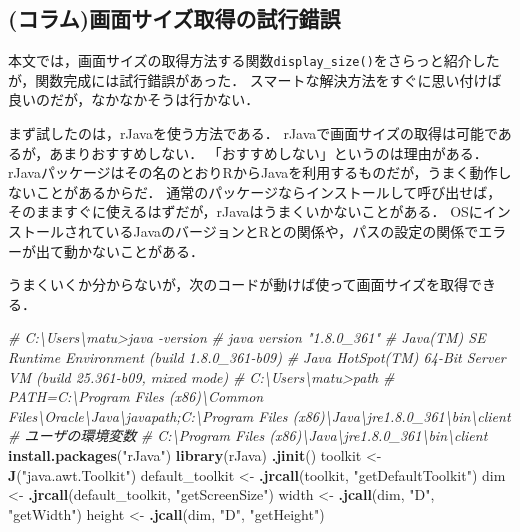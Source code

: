 \documentclass[
]{article}
\newenvironment{Shaded}{\begin{snugshade}}{\end{snugshade}}
\newcommand{\CommentTok}[1]{\textcolor[rgb]{0.56,0.35,0.01}{\textit{#1}}}
\newcommand{\FunctionTok}[1]{\textcolor[rgb]{0.13,0.29,0.53}{\textbf{#1}}}
\newcommand{\NormalTok}[1]{#1}
\newcommand{\OtherTok}[1]{\textcolor[rgb]{0.56,0.35,0.01}{#1}}
\newcommand{\StringTok}[1]{\textcolor[rgb]{0.31,0.60,0.02}{#1}}
\begin{document}
\hypertarget{ux30b3ux30e9ux30e0ux753bux9762ux30b5ux30a4ux30baux53d6ux5f97ux306eux8a66ux884cux932fux8aa4}{%
\subsection{(コラム)画面サイズ取得の試行錯誤}\label{ux30b3ux30e9ux30e0ux753bux9762ux30b5ux30a4ux30baux53d6ux5f97ux306eux8a66ux884cux932fux8aa4}}

本文では，画面サイズの取得方法する関数\texttt{display\_size()}をさらっと紹介したが，関数完成には試行錯誤があった．
スマートな解決方法をすぐに思い付けば良いのだが，なかなかそうは行かない．

まず試したのは，rJavaを使う方法である．
rJavaで画面サイズの取得は可能であるが，あまりおすすめしない．
「おすすめしない」というのは理由がある．
rJavaパッケージはその名のとおりRからJavaを利用するものだが，うまく動作しないことがあるからだ．
通常のパッケージならインストールして呼び出せば，そのまますぐに使えるはずだが，rJavaはうまくいかないことがある．
OSにインストールされているJavaのバージョンとRとの関係や，パスの設定の関係でエラーが出て動かないことがある．

うまくいくか分からないが，次のコードが動けば使って画面サイズを取得できる．

\begin{Shaded}
\begin{Highlighting}[]
  \CommentTok{\# C:\textbackslash{}Users\textbackslash{}matu\textgreater{}java {-}version}
  \CommentTok{\# java version "1.8.0\_361"}
  \CommentTok{\# Java(TM) SE Runtime Environment (build 1.8.0\_361{-}b09)}
  \CommentTok{\# Java HotSpot(TM) 64{-}Bit Server VM (build 25.361{-}b09, mixed mode)}
  \CommentTok{\# C:\textbackslash{}Users\textbackslash{}matu\textgreater{}path}
  \CommentTok{\# PATH=C:\textbackslash{}Program Files (x86)\textbackslash{}Common Files\textbackslash{}Oracle\textbackslash{}Java\textbackslash{}javapath;C:\textbackslash{}Program Files (x86)\textbackslash{}Java\textbackslash{}jre1.8.0\_361\textbackslash{}bin\textbackslash{}client}
  \CommentTok{\# ユーザの環境変数}
  \CommentTok{\#   C:\textbackslash{}Program Files (x86)\textbackslash{}Java\textbackslash{}jre1.8.0\_361\textbackslash{}bin\textbackslash{}client}
\FunctionTok{install.packages}\NormalTok{(}\StringTok{"rJava"}\NormalTok{)}
\FunctionTok{library}\NormalTok{(rJava)}
\FunctionTok{.jinit}\NormalTok{()}
\NormalTok{toolkit }\OtherTok{\textless{}{-}} \FunctionTok{J}\NormalTok{(}\StringTok{"java.awt.Toolkit"}\NormalTok{)}
\NormalTok{default\_toolkit }\OtherTok{\textless{}{-}} \FunctionTok{.jrcall}\NormalTok{(toolkit, }\StringTok{"getDefaultToolkit"}\NormalTok{)}
\NormalTok{dim }\OtherTok{\textless{}{-}} \FunctionTok{.jrcall}\NormalTok{(default\_toolkit, }\StringTok{"getScreenSize"}\NormalTok{)}
\NormalTok{width }\OtherTok{\textless{}{-}} \FunctionTok{.jcall}\NormalTok{(dim, }\StringTok{"D"}\NormalTok{, }\StringTok{"getWidth"}\NormalTok{)}
\NormalTok{height }\OtherTok{\textless{}{-}} \FunctionTok{.jcall}\NormalTok{(dim, }\StringTok{"D"}\NormalTok{, }\StringTok{"getHeight"}\NormalTok{)}
\end{Highlighting}
\end{Shaded}
\end{document}
